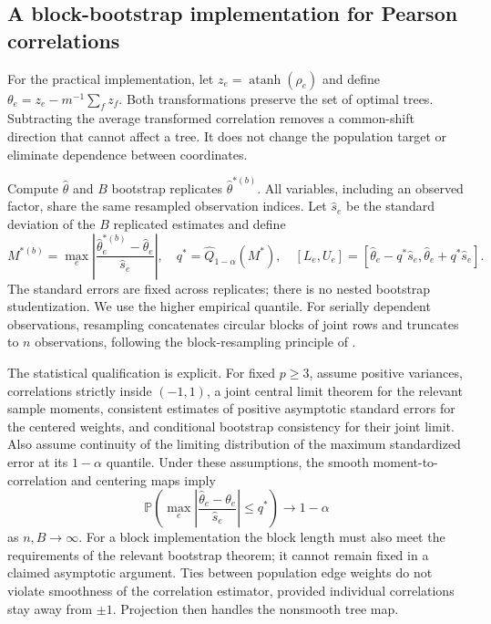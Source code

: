 \documentclass[pdflatex,sn-mathphys-ay]{sn-jnl}
\theoremstyle{thmstyleone}
\theoremstyle{thmstyletwo}
\newcommand{\Prob}{\mathbb P}
\begin{document}
\subsection{A block-bootstrap implementation for Pearson correlations}
For the practical implementation, let $z_e=\operatorname{atanh}(\rho_e)$ and define $\theta_e=z_e-m^{-1}\sum_f z_f$. Both transformations preserve the set of optimal trees. Subtracting the average transformed correlation removes a common-shift direction that cannot affect a tree. It does not change the population target or eliminate dependence between coordinates.

Compute $\widehat\theta$ and $B$ bootstrap replicates $\widehat\theta^{*(b)}$. All variables, including an observed factor, share the same resampled observation indices. Let $\widehat s_e$ be the standard deviation of the $B$ replicated estimates and define
\begin{equation}\label{eq:maxstat}
 M^{*(b)}=\max_e\left|\frac{\widehat\theta^{*(b)}_e-\widehat\theta_e}{\widehat s_e}\right|,
 \quad q^*=\widehat Q_{1-\alpha}(M^*),\quad
 [L_e,U_e]=[\widehat\theta_e-q^*\widehat s_e,\widehat\theta_e+q^*\widehat s_e].
\end{equation}
The standard errors are fixed across replicates; there is no nested bootstrap studentization. We use the higher empirical quantile. For serially dependent observations, resampling concatenates circular blocks of joint rows and truncates to $n$ observations, following the block-resampling principle of \citet{kunsch1989}.

The statistical qualification is explicit. For fixed $p\ge3$, assume positive variances, correlations strictly inside $(-1,1)$, a joint central limit theorem for the relevant sample moments, consistent estimates of positive asymptotic standard errors for the centered weights, and conditional bootstrap consistency for their joint limit. Also assume continuity of the limiting distribution of the maximum standardized error at its $1-\alpha$ quantile. Under these assumptions, the smooth moment-to-correlation and centering maps imply
\begin{equation}\label{eq:bootstrapassumption}
 \Prob\!\left(\max_e\left|\frac{\widehat\theta_e-\theta_e}{\widehat s_e}\right|\le q^*\right)\longrightarrow1-\alpha
\end{equation}
as $n,B\to\infty$. For a block implementation the block length must also meet the requirements of the relevant bootstrap theorem; it cannot remain fixed in a claimed asymptotic argument. Ties between population edge weights do not violate smoothness of the correlation estimator, provided individual correlations stay away from $\pm1$. Projection then handles the nonsmooth tree map.
\end{document}
